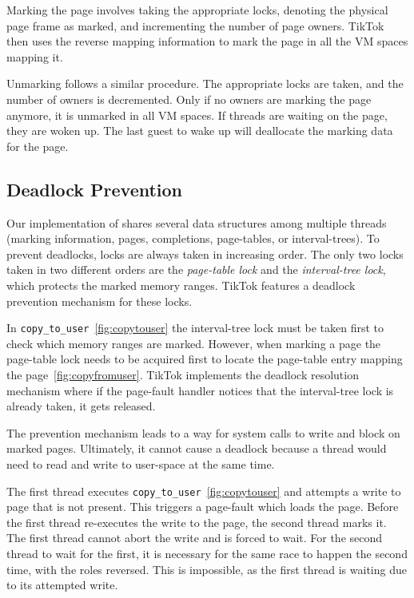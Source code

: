 \documentclass[conference]{IEEEtran}
\newcommand{\sysname}{TikTok}
\begin{document}
Marking the page involves taking the appropriate locks, denoting the physical
page frame as marked, and incrementing the number of page owners. \sysname{} then
uses the reverse mapping information to mark the page in all the VM spaces
mapping it.

Unmarking follows a similar procedure. The appropriate locks are taken, and the
number of owners is decremented. Only if no owners are marking the page
anymore, it is unmarked in all VM spaces. If threads are waiting on the
page, they are woken up. The last guest to wake up will deallocate the marking
data for the page.

\subsection{Deadlock Prevention}
\label{subsec:deadlockprevention}
Our implementation of shares several data structures
among multiple threads (marking information, pages, completions, page-tables, or
interval-trees).
To prevent deadlocks, locks are always taken in increasing order.
The only two locks taken in two different orders are the
\emph{page-table lock} and the \emph{interval-tree lock}, which protects the marked
memory ranges. \sysname{} features a deadlock prevention mechanism for these locks.


In \texttt{copy\_to\_user}~\autoref{fig:copytouser} the interval-tree lock must
be taken first to check which memory ranges are marked. However, when marking a
page the page-table lock needs to be acquired first to locate the page-table
entry mapping the page~\autoref{fig:copyfromuser}. \sysname{} implements the
deadlock resolution mechanism where if the page-fault handler notices that the
interval-tree lock is already taken, it gets released.

The prevention mechanism leads to a way for system calls to write and block
on marked pages. Ultimately, it cannot cause a deadlock because a thread would
need to read and write to user-space at the same time. 

The first thread executes \texttt{copy\_to\_user}~\autoref{fig:copytouser} and
attempts a write to page that is not present. This triggers a page-fault which
loads the page. Before the first thread re-executes the write to the page, the
second thread marks it. The first thread cannot abort the write and is forced to
wait. For the second thread to wait for the first, it is necessary for the same
race to happen the second time, with the roles reversed. This is impossible,
as the first thread is waiting due to its attempted write.
\end{document}
